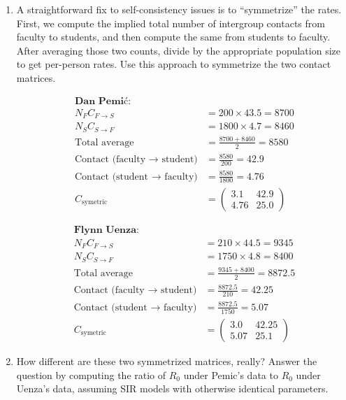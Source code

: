 \documentclass[11pt]{article}
\begin{document}
\begin{enumerate}
\begin{enumerate}[label=\alph*.]
\item A straightforward fix to self-consistency issues is to ``symmetrize'' the rates. First, we compute the implied total number of intergroup contacts from faculty to students, and then compute the same from students to faculty. After averaging those two counts, divide by the appropriate population size to get per-person rates. Use this approach to symmetrize the two contact matrices. 
\par
\begin{align*}
	\textbf{Dan Pemić:} \\
	N_F C_{F \to S} &= 200 \times 43.5 = 8700 \\
	N_S C_{S \to F} &= 1800 \times 4.7 = 8460 \\[6pt]
	\text{Total average} &= \frac{8700 + 8460}{2} = 8580 \\[12pt]
	\text{Contact (faculty $\to$ student)} &= \frac{8580}{200} = 42.9 \\[6pt]
	\text{Contact (student $\to$ faculty)} &= \frac{8580}{1800} = 4.76 \\[12pt]
	C_{\text{symetric}} &= 
	\begin{pmatrix}
	3.1 & 42.9 \\
	4.76 & 25.0
	\end{pmatrix}
\end{align*}

\begin{align*}
	\textbf{Flynn Uenza:} \\
	N_F C_{F \to S} &= 210 \times 44.5 = 9345 \\
	N_S C_{S \to F} &= 1750 \times 4.8 = 8400 \\[6pt]
	\text{Total average} &= \frac{9345 + 8400}{2} = 8872.5 \\[12pt]
	\text{Contact (faculty $\to$ student)} &= \frac{8872.5}{210} = 42.25 \\[6pt]
	\text{Contact (student $\to$ faculty)} &= \frac{8872.5}{1750} = 5.07 \\[12pt]
	C_{\text{symetric}} &= 
	\begin{pmatrix}
	3.0 & 42.25 \\
	5.07 & 25.1
	\end{pmatrix}
\end{align*}

\item How different are these two symmetrized matrices, really? Answer the question by computing the ratio of $R_0$ under Pemic's data to $R_0$ under Uenza's data, assuming SIR models with otherwise identical parameters.


\end{enumerate}
\end{enumerate}
\end{document}
